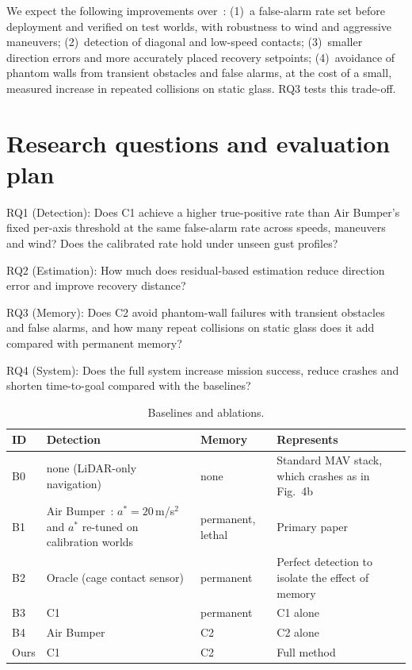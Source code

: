 \documentclass[conference,10pt]{IEEEtran}
\begin{document}
We expect the following improvements over~\cite{airbumper}: (1)~a false-alarm rate set before deployment and verified on test worlds, with robustness to wind and aggressive maneuvers; (2)~detection of diagonal and low-speed contacts; (3)~smaller direction errors and more accurately placed recovery setpoints; (4)~avoidance of phantom walls from transient obstacles and false alarms, at the cost of a small, measured increase in repeated collisions on static glass. RQ3 tests this trade-off.

\section{Research questions and evaluation plan}

RQ1 (Detection): Does C1 achieve a higher true-positive rate than Air Bumper's fixed per-axis threshold at the same false-alarm rate across speeds, maneuvers and wind? Does the calibrated rate hold under unseen gust profiles?

RQ2 (Estimation): How much does residual-based estimation reduce direction error and improve recovery distance?

RQ3 (Memory): Does C2 avoid phantom-wall failures with transient obstacles and false alarms, and how many repeat collisions on static glass does it add compared with permanent memory?

RQ4 (System): Does the full system increase mission success, reduce crashes and shorten time-to-goal compared with the baselines?

\begin{table}[t]
\caption{Baselines and ablations.}
\label{tab:base}
\footnotesize
\begin{tabularx}{\columnwidth}{@{}L{0.75cm}YL{1.55cm}L{1.9cm}@{}}
\toprule
\textbf{ID} & \textbf{Detection} & \textbf{Memory} & \textbf{Represents}\\
\midrule
B0 & none (LiDAR-only navigation) & none & Standard MAV stack, which crashes as in~\cite{airbumper} Fig.~4b\\
B1 & Air Bumper~\cite{airbumper}: $a^*=20$\,m/s$^2$ and $a^*$ re-tuned on calibration worlds & permanent, lethal & Primary paper\\
B2 & Oracle (cage contact sensor) & permanent & Perfect detection to isolate the effect of memory\\
B3 & C1 & permanent & C1 alone\\
B4 & Air Bumper & C2 & C2 alone\\
Ours & C1 & C2 & Full method\\
\bottomrule
\end{tabularx}
\end{table}
\end{document}
